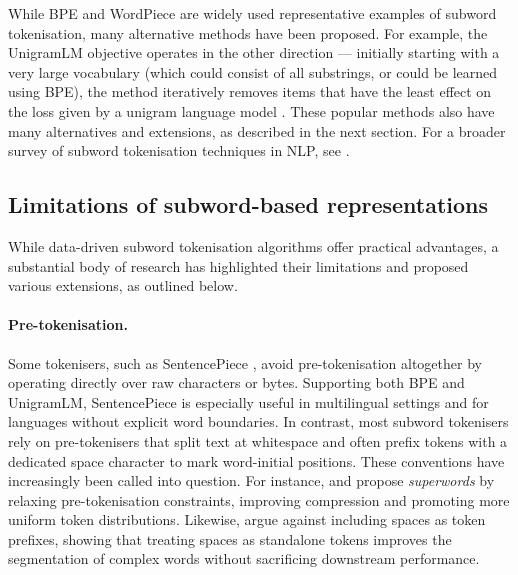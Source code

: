 While BPE and WordPiece are widely used representative examples of subword tokenisation, many alternative methods have been proposed. For example, the UnigramLM objective operates in the other direction --- initially starting with a very large vocabulary (which could consist of all substrings, or could be learned using BPE), the method iteratively removes items that have the least effect on the loss given by a unigram language model \citep{kudo-2018-unigram}. These popular methods also have many alternatives and extensions, as described in the next section.
For a broader survey of subword tokenisation techniques in NLP, see \citet{mielke2021between}.

\subsection{Limitations of subword-based representations}\label{sec:12-subwordlimitations}

While data-driven subword tokenisation algorithms offer practical advantages, a substantial body of research has highlighted their limitations and proposed various extensions, as outlined below.

\paragraph{Pre-tokenisation.} Some tokenisers, such as SentencePiece \citep{kudo-richardson-2018-sentencepiece}, avoid pre-tokenisation altogether by operating directly over raw characters or bytes. Supporting both BPE and UnigramLM, SentencePiece is especially useful in multilingual settings and for languages without explicit word boundaries. In contrast, most subword tokenisers rely on pre-tokenisers that split text at whitespace and often prefix tokens with a dedicated space character to mark word-initial positions. These conventions have increasingly been called into question. For instance, \citet{schmidt2025boundless} and \citet{liu2025superbpespacetravellanguage} propose \emph{superwords} by relaxing pre-tokenisation constraints, improving compression and promoting more uniform token distributions. Likewise, \citet{gow-smith-etal-2022-improving} argue against including spaces as token prefixes, showing that treating spaces as standalone tokens improves the segmentation of complex words without sacrificing downstream performance.

